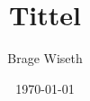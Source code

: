 \documentclass{article}%
\title{Tittel}%
\author{Brage Wiseth}%
\date{\today}%
\begin{document}
%
\normalsize%







\end{document}
